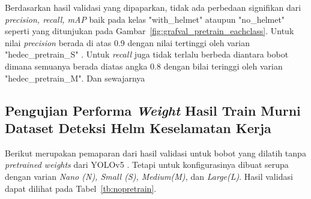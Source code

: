 \par Berdasarkan hasil validasi yang dipaparkan, tidak ada perbedaan signifikan dari \emph{precision, recall, mAP} 
baik pada kelas "with\_helmet" ataupun "no\_helmet" seperti yang ditunjukan pada Gambar~\ref{fig:grafval_pretrain_eachclass}.
Untuk nilai \emph{precision} berada di atas 0.9 dengan nilai tertinggi oleh varian "hedec\_pretrain\_S" . Untuk \emph{recall}
juga tidak terlalu berbeda diantara bobot dimana semuanya berada diatas angka 0.8 dengan bilai teringgi 
oleh varian "hedec\_pretrain\_M". Dan sewajarnya 

\subsection{Pengujian Performa \emph{Weight} Hasil Train Murni Dataset Deteksi Helm Keselamatan Kerja}
\label{subsec:murnidataset}

\par Berikut merupakan pemaparan dari hasil validasi untuk bobot yang dilatih tanpa \emph{pretrained weights}
dari YOLOv5 . Tetapi untuk konfigurasinya dibuat serupa dengan varian \emph{Nano (N), Small (S), Medium(M),} dan \emph{Large(L)}. 
Hasil validasi dapat dilihat pada Tabel~\ref{tb:nopretrain}.


